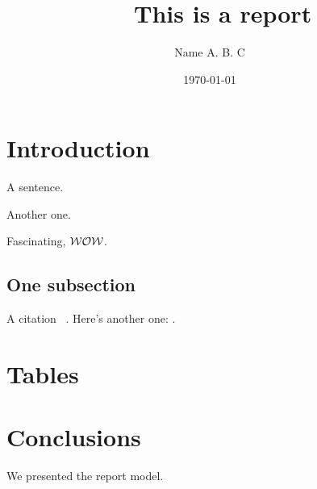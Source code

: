 \documentclass{tex/myclass}
\title{\faNewspaperO~~This is a report}
\author{Name A. B. C}
\date{\today}
\begin{document}
\maketitle
\tableofcontents



\section{Introduction}
\label{sec:introduction}

A sentence. 

Another one. 

Fascinating, $\mathcal{W}\mathcal{O}\mathcal{W}$.

\subsection{One subsection}
\label{subsec:one_subsection}
A citation \faArrowRight~\cite{Goodfellow-et-al-2016}. Here's another one: \cite{duque2019}.

\section{Tables}
\label{sec:tables}

\vspace*{-0.5cm}
\begin{table}[h!]
	\centering
	\caption{This is an example.}
	\label{tab:my-table}
\end{table}

\section{Conclusions}
\label{sec:conclusions}
We presented the report model.




\end{document}
